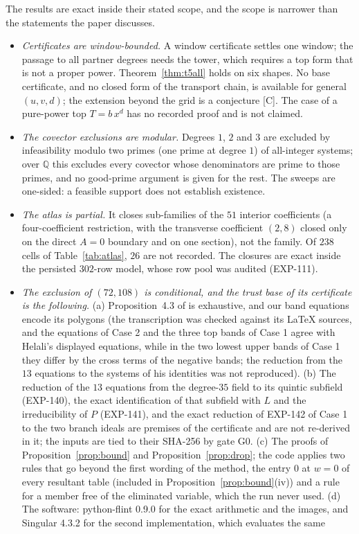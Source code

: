 \documentclass[11pt]{article}
\theoremstyle{remark}
\newcommand{\Q}{\mathbb{Q}}
\begin{document}
The results are exact inside their stated scope, and the scope is narrower than the statements the paper discusses.
\begin{itemize}
\item \emph{Certificates are window-bounded.} A window certificate settles one window; the passage to all partner degrees needs the tower, which requires a top form that is not a proper power.
Theorem~\ref{thm:t5all} holds on six shapes. No base certificate, and no closed form of the transport chain, is available for general $(u,v,d)$; the extension beyond the grid is a conjecture [C]. The case of a pure-power top $T=b\,x^d$
has no recorded proof and is not claimed.
\item \emph{The covector exclusions are modular.} Degrees $1$, $2$ and $3$ are excluded by infeasibility modulo two primes (one prime at degree $1$) of all-integer systems; over $\Q$ this
excludes every covector whose denominators are prime to those primes, and no good-prime argument is given for the rest. The sweeps are one-sided: a feasible support does not establish existence.
\item \emph{The atlas is partial.} It closes sub-families of the $51$ interior coefficients (a four-coefficient restriction, with the transverse coefficient $(2,8)$ closed only on the direct $A=0$ boundary
and on one section), not the family. Of $238$ cells of Table~\ref{tab:atlas}, $26$ are not recorded. The closures are exact inside the persisted $302$-row model, whose row pool was audited (EXP-111).
\item \emph{The exclusion of $(72,108)$ is conditional, and the trust base of its certificate is the following.} (a) Proposition~4.3 of \cite{GGHV2022} is exhaustive, and our band equations encode its polygons (the transcription was checked against its LaTeX sources, and the equations of Case 2 and the three top bands of Case 1 agree with Helali's displayed equations,
while in the two lowest upper bands of Case 1 they differ by the cross terms of the negative bands; the reduction from the $13$ equations to the systems of his identities was not reproduced). (b) The reduction of the $13$ equations from the degree-$35$ field to its quintic subfield (EXP-140), the exact identification of that subfield with $L$ and the irreducibility of $P$ (EXP-141), and the exact reduction of EXP-142 of Case 1 to the two branch ideals are premises of the certificate and are not re-derived in it; the inputs are tied to their SHA-256 by gate G0.
(c) The proofs of Proposition~\ref{prop:bound} and Proposition~\ref{prop:drop}; the code applies two rules that go beyond the first wording of the method, the entry $0$ at $w=0$ of every resultant table (included in Proposition~\ref{prop:bound}(iv)) and a rule for a member free of the eliminated variable, which the run never used. (d) The software: python-flint 0.9.0 for the exact arithmetic and the images, and Singular 4.3.2 for the second implementation, which evaluates the same

\end{itemize}
\end{document}
